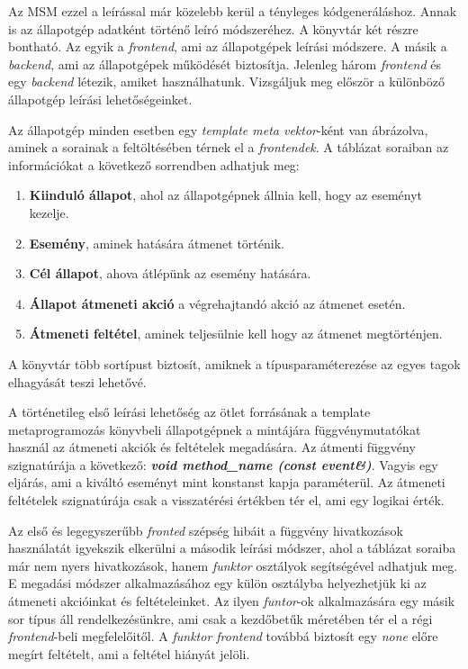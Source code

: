 \documentclass[a4paper,12pt]{report}
\begin{document}
Az MSM ezzel a leírással már közelebb kerül a tényleges kódgeneráláshoz. Annak is az állapotgép adatként történő leíró módszeréhez. A könyvtár két részre bontható. Az egyik a {\it frontend}, ami az állapotgépek leírási módszere. A másik a {\it backend}, ami az állapotgépek működését biztosítja. Jelenleg három {\it frontend} és egy {\it backend} létezik, amiket használhatunk. Vizsgáljuk meg először a különböző állapotgép leírási lehetőségeinket.

Az állapotgép minden esetben egy {\it template meta vektor}-ként van ábrázolva, aminek a sorainak a feltöltésében térnek el a {\it frontendek}. A táblázat soraiban az információkat a következő sorrendben adhatjuk meg:
\begin{enumerate}
\item {\bf Kiinduló állapot}, ahol az állapotgépnek állnia kell, hogy az eseményt kezelje.
\item {\bf Esemény}, aminek hatására átmenet történik.
\item {\bf Cél állapot}, ahova átlépünk az esemény hatására.
\item {\bf Állapot átmeneti akció} a végrehajtandó akció az átmenet esetén.
\item {\bf Átmeneti feltétel}, aminek teljesülnie kell hogy az átmenet megtörténjen.
\end{enumerate}
A könyvtár több sortípust biztosít, amiknek a típusparaméterezése az egyes tagok elhagyását teszi lehetővé.

A történetileg első leírási lehetőség az ötlet forrásának a template metaprogramozás könyvbeli állapotgépnek a mintájára függvénymutatókat használ az átmeneti akciók és feltételek megadására.
Az átmenti függvény szignatúrája a következő: 
\linebreak
{\it \bf void method\_name (const event\&)}.%
Vagyis egy eljárás, ami a kiváltó eseményt mint konstanst kapja paraméterül. Az átmeneti feltételek szignatúrája csak a visszatérési értékben tér el, ami egy logikai érték.

Az első és legegyszerűbb {\it fronted} szépség hibáit a függvény hivatkozások használatát igyekszik elkerülni a második leírási módszer, ahol a táblázat soraiba már nem nyers hivatkozások, hanem {\it funktor} osztályok segítségével adhatjuk meg. %
E megadási módszer alkalmazásához egy külön osztályba helyezhetjük ki az átmeneti akcióinkat és feltételeinket.
Az ilyen {\it funtor}-ok alkalmazására egy másik sor típus áll rendelkezésünkre, ami csak a kezdőbetűk méretében tér el a régi {\it frontend}-beli megfelelőitől. A {\it funktor frontend} továbbá biztosít egy {\it none} előre megírt feltételt, ami a feltétel hiányát jelöli.
\end{document}
